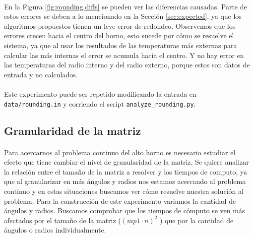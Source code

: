\documentclass[12pt]{article}
\begin{document}
\paragraph{} En la Figura \ref{fig:rounding.diffs} se pueden ver las diferencias causadas. Parte de estos errores se deben a lo mencionado en la Sección \ref{sec:expected}, ya que los algoritmos propuestos tienen un leve error de redondeo. Observemos que los errores crecen hacia el centro del horno, esto sucede por cómo se resuelve el sistema, ya que al usar los resultados de las temperaturas más externas para calcular las más internas el error se acumula hacia el centro. Y no hay error en las temperaturas del radio interno y del radio externo, porque estos son datos de entrada y no calculados.

\paragraph{} Este experimento puede ser repetido modificando la entrada en \texttt{data/rounding.in} y corriendo el script \texttt{analyze\_rounding.py}.


\subsection{Granularidad de la matriz}

\paragraph{} Para acercarnos al problema continuo del alto horno es necesario estudiar el efecto que tiene cambiar el nivel de granularidad de la matriz. Se quiere analizar la relación entre el tamaño de la matriz a resolver y los tiempos de computo, ya que al granularizar en más ángulos y radios nos estamos acercando al problema continuo y en estas situaciones buscamos ver cómo resuelve nuestra solución al problema. Para la construcción de este experimento variamos la cantidad de ángulos y radios. Buscamos comprobar que los tiempos de cómputo se ven más afectados por el tamaño de la matriz (\((mp1 \cdot n)^2\) ) que por la cantidad de ángulos o radios individualmente.
\end{document}
